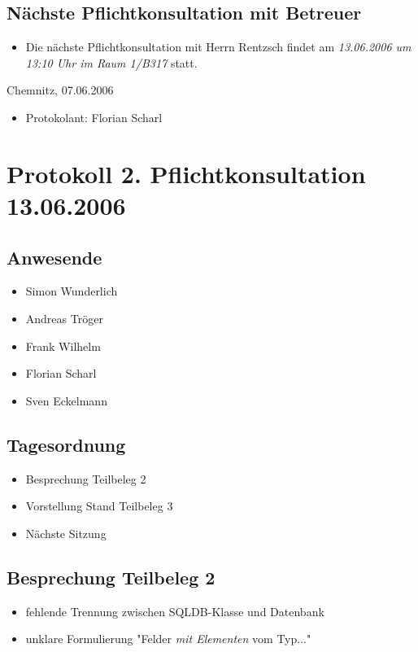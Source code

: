 			\subsection{Nächste Pflichtkonsultation mit Betreuer}
			\begin{itemize}
			\item Die nächste Pflichtkonsultation mit Herrn Rentzsch findet am {\em 13.06.2006 um 13:10 Uhr im Raum 			1/B317 } statt.
			\end{itemize}
			Chemnitz, 07.06.2006
			\begin{itemize}
				\item Protokolant: Florian Scharl
			\end{itemize}
\newpage
		\section{Protokoll 2. Pflichtkonsultation 13.06.2006}
		\subsection{Anwesende}
		\begin{itemize}
			\item Simon Wunderlich
			\item Andreas Tröger
			\item Frank Wilhelm
			\item Florian Scharl
			\item Sven Eckelmann
		\end{itemize}
		\subsection{Tagesordnung}
		\begin{itemize}
			\item Besprechung Teilbeleg 2
			\item Vorstellung Stand Teilbeleg 3
			\item Nächste Sitzung
		\end{itemize}
			\subsection{Besprechung Teilbeleg 2}
			\begin{itemize}
				\item fehlende Trennung zwischen SQLDB-Klasse und Datenbank
				\item unklare Formulierung "Felder {\it mit Elementen} vom Typ..."
			\end{itemize}
